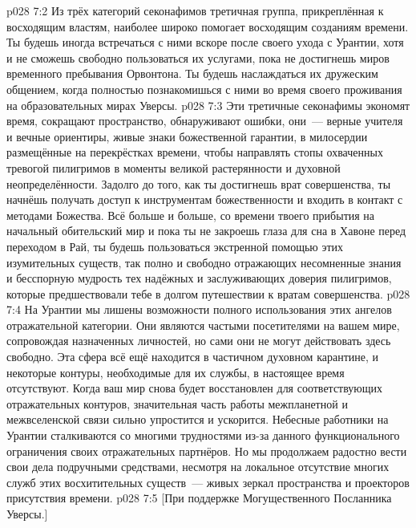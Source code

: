 \vs p028 7:2 \pc Из трёх категорий секонафимов третичная группа, прикреплённая к восходящим властям, наиболее широко помогает восходящим созданиям времени. Ты будешь иногда встречаться с ними вскоре после своего ухода с Урантии, хотя и не сможешь свободно пользоваться их услугами, пока не достигнешь миров временного пребывания Орвонтона. Ты будешь наслаждаться их дружеским общением, когда полностью познакомишься с ними во время своего проживания на образовательных мирах Уверсы.
\vs p028 7:3 Эти третичные секонафимы экономят время, сокращают пространство, обнаруживают ошибки, они~--- верные учителя и вечные ориентиры, живые знаки божественной гарантии, в милосердии размещённые на перекрёстках времени, чтобы направлять стопы охваченных тревогой пилигримов в моменты великой растерянности и духовной неопределённости. Задолго до того, как ты достигнешь врат совершенства, ты начнёшь получать доступ к инструментам божественности и входить в контакт с методами Божества. Всё больше и больше, со времени твоего прибытия на начальный обительский мир и пока ты не закроешь глаза для сна в Хавоне перед переходом в Рай, ты будешь пользоваться экстренной помощью этих изумительных существ, так полно и свободно отражающих несомненные знания и бесспорную мудрость тех надёжных и заслуживающих доверия пилигримов, которые предшествовали тебе в долгом путешествии к вратам совершенства.
\vs p028 7:4 На Урантии мы лишены возможности полного использования этих ангелов отражательной категории. Они являются частыми посетителями на вашем мире, сопровождая назначенных личностей, но сами они не могут действовать здесь свободно. Эта сфера всё ещё находится в частичном духовном карантине, и некоторые контуры, необходимые для их службы, в настоящее время отсутствуют. Когда ваш мир снова будет восстановлен для соответствующих отражательных контуров, значительная часть работы межпланетной и межвселенской связи сильно упростится и ускорится. Небесные работники на Урантии сталкиваются со многими трудностями из\hyp{}за данного функционального ограничения своих отражательных партнёров. Но мы продолжаем радостно вести свои дела подручными средствами, несмотря на локальное отсутствие многих служб этих восхитительных существ~--- живых зеркал пространства и проекторов присутствия времени.
\vsetoff
\vs p028 7:5 [При поддержке Могущественного Посланника Уверсы.]
\quizlink
